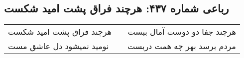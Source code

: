 \begin{center}
\section*{رباعی شماره ۴۳۷: هرچند فراق پشت امید شکست}
\label{sec:0437}
\begin{longtable}{l p{0.5cm} r}
هرچند فراق پشت امید شکست
&&
هرچند جفا دو دوست آمال ببست
\\
نومید نمیشود دل عاشق مست
&&
مردم برسد بهر چه همت دربست
\\
\end{longtable}
\end{center}
